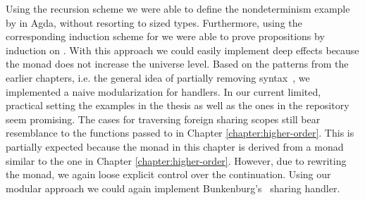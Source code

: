 Using the recursion scheme we were able to define the nondeterminism example by
\textcite{DBLP:conf/lics/PirogSWJ18} in Agda, without resorting to sized types.
Furthermore, using the corresponding induction scheme for  we
were able to prove propositions by induction on .
With this approach we could easily implement deep effects because the
 monad does not increase the universe level.
Based on the patterns from the earlier chapters, i.e. the general idea of
partially removing syntax~\cite{DBLP:conf/haskell/SchrijversPWJ19}, we
implemented a naive modularization for handlers.
In our current limited, practical setting the examples in the thesis as well as
the ones in the repository seem promising.
The cases for traversing foreign sharing scopes still bear resemblance to the
functions passed to  in Chapter \ref{chapter:higher-order}.
This is partially expected because the monad in this chapter is derived from a
monad similar to the one in Chapter \ref{chapter:higher-order}.
However, due to rewriting the monad, we again loose explicit control over the
continuation.
Using our modular approach we could again implement
Bunkenburg's~\cite{bunkenburg2019modeling} sharing handler.
